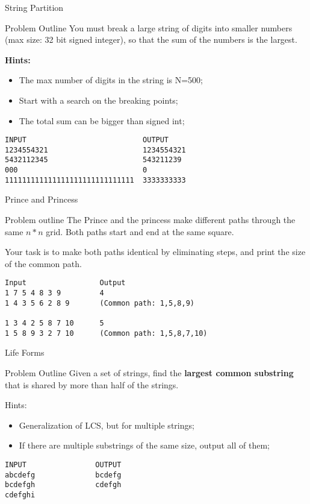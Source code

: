 \begin{frame}[fragile]{String Partition}
  \begin{block}{Problem Outline}
    You must break a large string of digits into smaller numbers (max size: 32 bit signed integer), so that the sum of the numbers is the largest.\bigskip

    {\bf Hints:}
    \begin{itemize}
    \item The max number of digits in the string is N=500;
    \item Start with a search on the breaking points;
    \item The total sum can be bigger than signed int;
    \end{itemize}
  \end{block}
\begin{verbatim}
INPUT                           OUTPUT
1234554321                      1234554321
5432112345                      543211239
000                             0
111111111111111111111111111111  3333333333
\end{verbatim}
\end{frame}

\begin{frame}[fragile]{Prince and Princess}
  \begin{block}{Problem outline}
    The Prince and the princess make different paths through the same $n*n$ grid. Both paths start and end at the same square.\bigskip

    Your task is to make both paths identical by eliminating steps, and print the size of the common path.
  \end{block}
\begin{verbatim}
Input                 Output
1 7 5 4 8 3 9         4
1 4 3 5 6 2 8 9       (Common path: 1,5,8,9)

1 3 4 2 5 8 7 10      5
1 5 8 9 3 2 7 10      (Common path: 1,5,8,7,10)
\end{verbatim}
\end{frame}


\begin{frame}[fragile]{Life Forms}
  \begin{block}{Problem Outline}
    Given a set of strings, find the {\bf largest common substring} that is shared by more than half of the strings.
    \bigskip

    Hints:
    \begin{itemize}
      \item Generalization of LCS, but for multiple strings;
      \item If there are multiple substrings of the same size, output all of them;
    \end{itemize}
  \end{block}

\begin{verbatim}
INPUT                OUTPUT
abcdefg              bcdefg
bcdefgh              cdefgh
cdefghi
\end{verbatim}
\end{frame}


